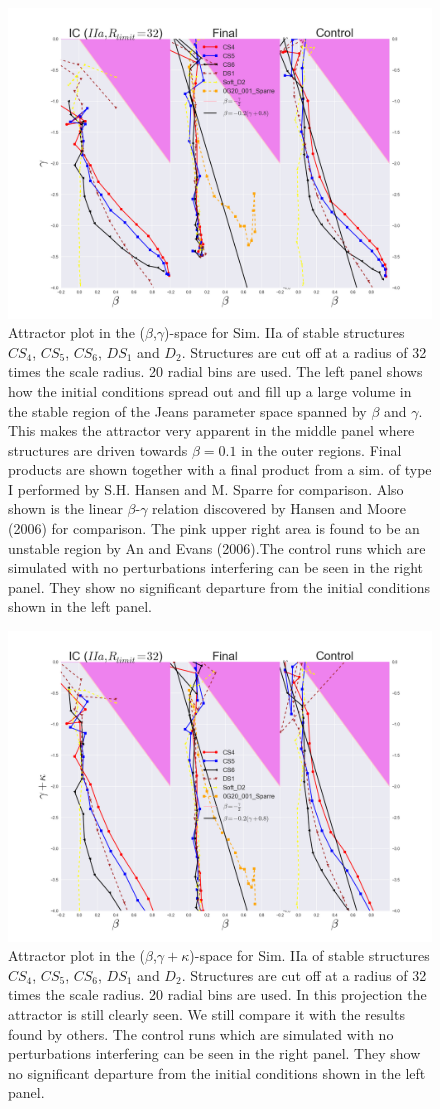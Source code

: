 \begin{figure}[!htbp]
\centering
\includegraphics[width=1.0 cm]{img/beta_vs_gamma_CS4CS5CS6DS1D2_Rlimit32.png}
\caption{Attractor plot in the ($\beta$,$\gamma$)-space for Sim. IIa of stable structures $CS_4$, $CS_5$, $CS_6$, $DS_1$ and $D_2$. Structures are cut off at a radius of 32 times the scale radius. 20 radial bins are used. The left panel shows how the initial conditions spread out and fill up a large volume in the stable region of the Jeans parameter space spanned by $\beta$ and $\gamma$. This makes the attractor very apparent in the middle panel where structures are driven towards $\beta = 0.1$ in the outer regions. Final products are shown together with a final product from a sim. of type I performed by S.H. Hansen and M. Sparre for comparison. Also shown is the linear $\beta$-$\gamma$ relation discovered by Hansen and Moore (2006) for comparison. The pink upper right area is found to be an unstable region by An and Evans (2006).The control runs which are simulated with no perturbations interfering can be seen in the right panel. They show no significant departure from the initial conditions shown in the left panel.}
\label{fig:test}
\end{figure}

\begin{figure}[!htbp]
\centering
\includegraphics[width=1.0 cm]{img/beta_vs_gamma_plus_kappa_CS4CS5CS6DS1D2_Rlimit32.png}
\caption{Attractor plot in the ($\beta$,$\gamma + \kappa$)-space for Sim. IIa of stable structures $CS_4$, $CS_5$, $CS_6$, $DS_1$ and $D_2$.
Structures are cut off at a radius of 32 times the scale radius. 20 radial bins are used. In this projection the attractor is still clearly seen. We still compare it with the results found by others. The control runs which are simulated with no perturbations interfering can be seen in the right panel. They show no significant departure from the initial conditions shown in the left panel.}
\label{fig:test}
\end{figure}

